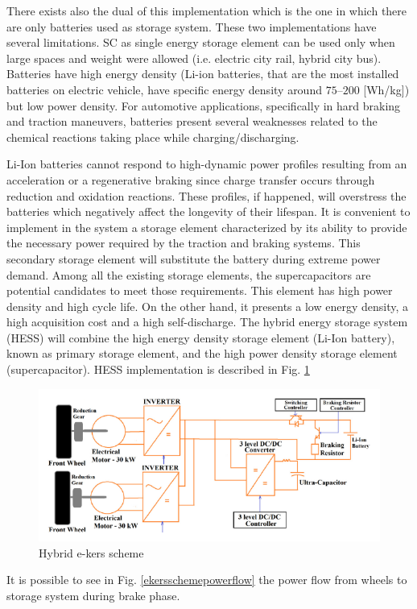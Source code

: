 \documentclass[11pt]{article}
\begin{document}
There exists also the dual of this implementation which is the one in which there are only batteries used as storage system. These two implementations have several limitations. SC as single energy storage element can be used only when large spaces and weight were allowed (i.e. electric city rail, hybrid city bus). Batteries have high energy density (Li-ion batteries, that are the most installed batteries on electric vehicle, have specific energy density around $75–200$ [Wh/kg]) but low power density. For automotive applications, specifically in hard braking and traction maneuvers, batteries present several weaknesses related to the chemical reactions taking place while charging/discharging. 

Li-Ion batteries cannot respond to high-dynamic power profiles resulting from an acceleration or a regenerative braking since charge transfer occurs through reduction and oxidation reactions. These profiles, if happened, will overstress the batteries which negatively affect the longevity of their lifespan. It is convenient to implement in the system a storage element characterized by its ability to provide the necessary power required by the traction and braking systems. This secondary storage element will substitute the battery during extreme power demand. Among all the existing storage elements, the supercapacitors are potential candidates to meet those requirements. This element has high power density and high cycle life. On the other hand, it presents a low energy density, a high acquisition cost and a high self-discharge. The hybrid energy storage system (HESS) will combine the high energy density storage element (Li-Ion battery), known as primary storage element, and the high power density storage element (supercapacitor). HESS implementation is described in Fig. \ref{ekersschemehybrid}

\begin{figure}[H]
	\centering
	\includegraphics[width=.6\textwidth]{Images/State_of_the_art/Electric_KERS_scheme_hybrid.PNG}
	\caption{Hybrid e-kers scheme}
	\label{ekersschemehybrid}
\end{figure}

It is possible to see in Fig. \ref{ekersschemepowerflow} the power flow from wheels to storage system during brake phase.
\end{document}
